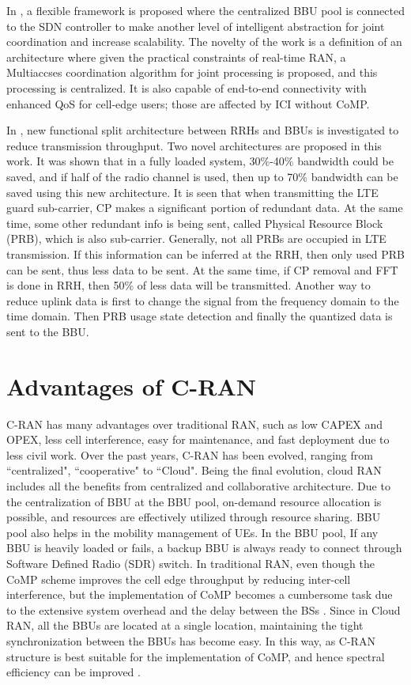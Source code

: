 \begin{multicols}{2}
In \cite{art3-key30}, a flexible framework is proposed where the centralized BBU pool is connected to the SDN controller to make another level of intelligent abstraction for joint coordination and increase scalability. The novelty of the work is a definition of an architecture where given the practical constraints of real-time RAN, a Multiaccses coordination algorithm for joint processing is proposed, and this processing is centralized. It is also capable of end-to-end connectivity with enhanced QoS for cell-edge users; those are affected by ICI without CoMP.

In \cite{art3-key31}, new functional split architecture between RRHs and BBUs is investigated to reduce transmission throughput. Two novel architectures are proposed in this work. It was shown that in a fully loaded system, 30\%-40\% bandwidth could be saved, and if half of the radio channel is used, then up to 70\% bandwidth can be saved using this new architecture. It is seen that when transmitting the LTE guard sub-carrier, CP makes a significant portion of redundant data. At the same time, some other redundant info is being sent, called Physical Resource Block (PRB), which is also sub-carrier. Generally, not all PRBs are occupied in LTE transmission. If this information can be inferred at the RRH, then only used PRB can be sent, thus less data to be sent. At the same time, if CP removal and FFT is done in RRH, then 50\% of less data will be transmitted. Another way to reduce uplink data is first to change the signal from the frequency domain to the time domain. Then PRB usage state detection and finally the quantized data is sent to the BBU.

\section{Advantages of C-RAN}\label{sect03}

C-RAN has many advantages over traditional RAN, such as low CAPEX and OPEX, less cell interference, easy for maintenance, and fast deployment due to less civil work. Over the past years, C-RAN has been evolved, ranging from ``centralized", ``cooperative" to ``Cloud". Being the final evolution, cloud RAN includes all the benefits from centralized and collaborative architecture. Due to the centralization of BBU at the BBU pool, on-demand resource allocation is possible, and resources are effectively utilized through resource sharing. BBU pool also helps in the mobility management of UEs. In the BBU pool, If any BBU is heavily loaded or fails, a backup BBU is always ready to connect through Software Defined Radio (SDR) switch. In traditional RAN, even though the CoMP scheme improves the cell edge throughput by reducing inter-cell interference, but the implementation of CoMP becomes a cumbersome task due to the extensive system overhead and the delay between the BSs \cite{art3-key03}. Since in Cloud RAN, all the BBUs are located at a single location, maintaining the tight synchronization between the BBUs has become easy. In this way, as C-RAN structure is best suitable for the implementation of CoMP, and hence spectral efficiency can be improved \cite{art3-key32}. 


\end{multicols}
